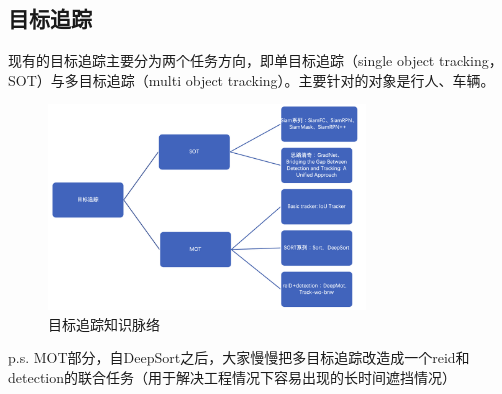 \documentclass[lang=cn,11pt,a4paper]{elegant_template}
\begin{document}
\subsection{目标追踪}
现有的目标追踪主要分为两个任务方向，即单目标追踪（single object tracking，SOT）与多目标追踪（multi object tracking）。主要针对的对象是行人、车辆。
\begin{figure}[htbp]
  \centering
  \includegraphics[width=0.75\textwidth]{image/cv_6.png}
  \caption{目标追踪知识脉络}
\end{figure}
p.s. MOT部分，自DeepSort之后，大家慢慢把多目标追踪改造成一个reid和detection的联合任务（用于解决工程情况下容易出现的长时间遮挡情况）

\hfill
\end{document}
